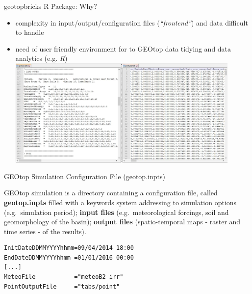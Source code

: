 \documentclass[ignorenonframetext,]{beamer}
\providecommand{\tightlist}{%
  \setlength{\itemsep}{0pt}\setlength{\parskip}{0pt}}
\begin{document}
\begin{frame}{geotopbricks R Package: Why?}

\begin{itemize}
\tightlist
\item
  complexity in input/output/configuration files (\emph{``frontend''})
  and data difficult to handle
\item
  need of user friendly environment for to GEOtop data tidying and data
  analytics (e.g. \emph{R})
  \includegraphics[width=0.90000\textwidth]{resources/images/Capture_IO_GEOtopJPG.JPG}\\
\end{itemize}

\end{frame}

\begin{frame}[fragile]{GEOtop Simulation Configuration File
(geotop.inpts)}

GEOtop simulation is a directory containing a configuration file, called
\textbf{geotop.inpts} filled with a keywords system addressing to
simulation options (e.g.~simulation period); \textbf{input files}
(e.g.~meteorological forcings, soil and geomorphology of the basin);
\textbf{output files} (spatio-temporal maps - raster and time series -
of the results).

\begin{verbatim}
InitDateDDMMYYYYhhmm=09/04/2014 18:00  
EndDateDDMMYYYYhhmm =01/01/2016 00:00 
[...] 
MeteoFile           ="meteoB2_irr" 
PointOutputFile     ="tabs/point" 
\end{verbatim}

\end{frame}
\end{document}
